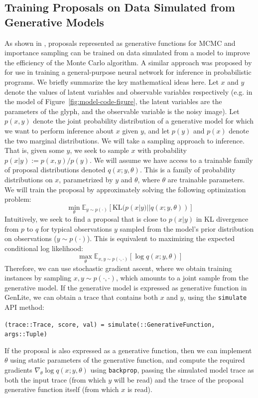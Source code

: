 \documentclass{article}
\begin{document}
\subsection{Training Proposals on Data Simulated from Generative Models}
As shown in \cite{cusumano2018using}, proposals represented as generative functions for MCMC and importance sampling can be trained on data simulated from a model to improve the efficiency of the Monte Carlo algorithm.
A similar approach was proposed by \cite{le2016inference} for use in training a general-purpose neural network for inference in probabilistic programs.
We briefly summarize the key mathematical ideas here.
Let $x$ and $y$ denote the values of latent variables and observable variables respectively (e.g. in the model of Figure~\ref{fig:model-code-figure}, the latent variables are the parameters of the glyph, and the observable variable is the noisy image).
Let $p(x, y)$ denote the joint probability distribution of a generative model for which we want to perform inference about $x$ given $y$, and let $p(y)$ and $p(x)$ denote the two marginal distributions.
We will take a sampling approach to inference.
That is, given some $y$, we seek to sample $x$ with probability $p(x | y) := p(x, y) / p(y)$.
We will assume we have access to a trainable family of proposal distributions denoted $q(x; y, \theta)$.
This is a family of probability distributions on $x$, parametrized by $y$ and $\theta$, where $\theta$ are trainable parameters.
We will train the proposal by approximately solving the following optimization problem:
\[
\min_{\theta} \mathbb{E}_{y \sim p(\cdot)} \left[ \mbox{KL}(p(x | y) || q(x; y, \theta)) \right]
\]
Intuitively, we seek to find a proposal that is close to $p(x | y)$ in KL divergence from $p$ to $q$ for typical observations $y$ sampled from the model's prior distribution on observations ($y \sim p(\cdot)$).
This is equivalent to maximizing the expected conditional log likelihood:
\[
\max_{\theta} \mathbb{E}_{x, y \sim p(\cdot, \cdot)} \left[ \log q(x; y, \theta) \right]
\]
Therefore, we can use stochastic gradient ascent, where we obtain training instances by sampling $x, y \sim p(\cdot, \cdot)$, which amounts to a joint sample from the generative model.
If the generative model is expressed as generative function in GenLite, we can obtain a trace that contains both $x$ and $y$, using the \texttt{simulate} API method:
\begin{center}
    \texttt{(trace::Trace, score, val) = simulate(::GenerativeFunction, args::Tuple)}
\end{center}
If the proposal is also expressed as a generative function, then we can implement $\theta$ using static parameters of the generative function, and compute the required gradients $\nabla_{\theta} \log q(x; y, \theta)$ using \texttt{backprop}, passing the simulated model trace as both the input trace (from which $y$ will be read) and the trace of the proposal generative function itself (from which $x$ is read).
\end{document}
